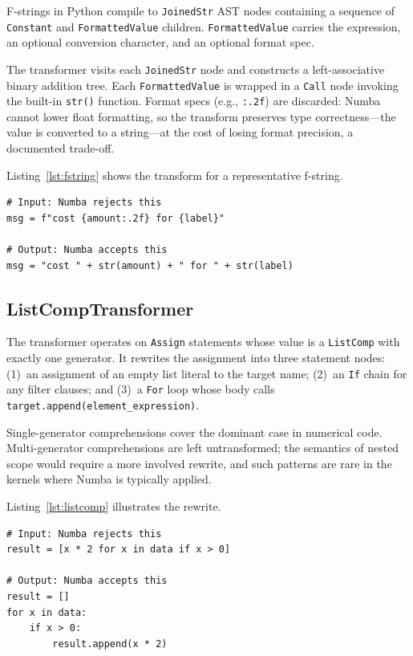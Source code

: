 \documentclass[journal]{IEEEtran}
\begin{document}
F-strings in Python compile to \texttt{JoinedStr} AST nodes containing a
sequence of \texttt{Constant} and \texttt{FormattedValue} children.
\texttt{FormattedValue} carries the expression, an optional conversion
character, and an optional format spec.

The transformer visits each \texttt{JoinedStr} node and constructs a
left-associative binary addition tree. Each \texttt{FormattedValue} is wrapped
in a \texttt{Call} node invoking the built-in \texttt{str()} function. Format
specs (e.g., \texttt{:.2f}) are discarded: Numba cannot lower float
formatting, so the transform preserves type correctness—the value is
converted to a string—at the cost of losing format precision, a documented
trade-off.

Listing~\ref{lst:fstring} shows the transform for a representative f-string.

\begin{lstlisting}[style=python, caption={FStringTransformer input and output.}, label={lst:fstring}]
# Input: Numba rejects this
msg = f"cost {amount:.2f} for {label}"

# Output: Numba accepts this
msg = "cost " + str(amount) + " for " + str(label)
\end{lstlisting}

\subsection{ListCompTransformer}

The transformer operates on \texttt{Assign} statements whose value is a
\texttt{ListComp} with exactly one generator. It rewrites the assignment into
three statement nodes: (1)~an assignment of an empty list literal to the
target name; (2)~an \texttt{If} chain for any filter clauses; and (3)~a
\texttt{For} loop whose body calls \texttt{target.append(element\_expression)}.

Single-generator comprehensions cover the dominant case in numerical code.
Multi-generator comprehensions are left untransformed; the semantics of nested
scope would require a more involved rewrite, and such patterns are rare in
the kernels where Numba is typically applied.

Listing~\ref{lst:listcomp} illustrates the rewrite.

\begin{lstlisting}[style=python, caption={ListCompTransformer input and output.}, label={lst:listcomp}]
# Input: Numba rejects this
result = [x * 2 for x in data if x > 0]

# Output: Numba accepts this
result = []
for x in data:
    if x > 0:
        result.append(x * 2)
\end{lstlisting}
\end{document}

